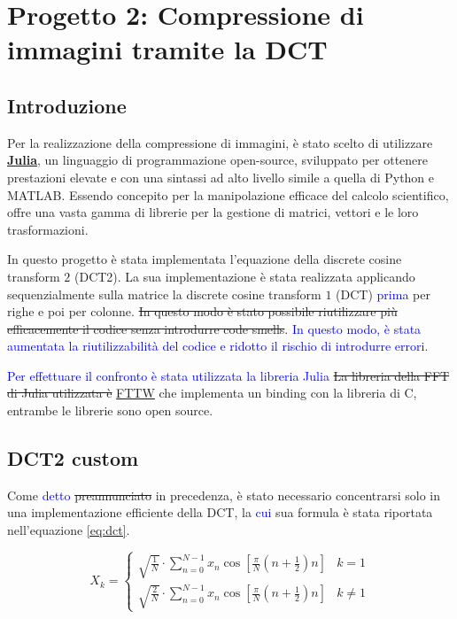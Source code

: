 \chapter{Progetto 2: Compressione di immagini tramite la DCT}

\section{Introduzione}
Per la realizzazione della compressione di immagini, è stato scelto di utilizzare
\href{https://julialang.org/}{\textbf{Julia}}, un linguaggio di programmazione open-source,
sviluppato per ottenere prestazioni elevate e con una sintassi ad alto livello simile
a quella di Python e MATLAB. Essendo concepito per la manipolazione efficace del
calcolo scientifico, offre una vasta gamma di librerie per la gestione di matrici,
vettori e le loro trasformazioni.

In questo progetto è stata implementata l'equazione della discrete cosine transform $2$ (DCT2).
La sua implementazione è stata realizzata applicando sequenzialmente sulla matrice
la discrete cosine transform $1$ (DCT) \textcolor{blue}{prima} per righe e poi
per colonne. \st{In questo modo è stato possibile riutilizzare più efficacemente il
    codice senza introdurre code smells}. %
\textcolor{blue}{In questo modo, è stata aumentata la riutilizzabilità del codice
    e ridotto il rischio di introdurre errori.}

\textcolor{blue}{Per effettuare il confronto è stata utilizzata la libreria Julia}
\st{La libreria della FFT di Julia utilizzata è} \href{https://github.com/JuliaMath/FFTW.jl}{FTTW}
che implementa un binding con la libreria di C, entrambe le librerie sono open source.

\section{DCT2 custom}
Come \textcolor{blue}{detto} \st{preannunciato} in precedenza, è stato necessario concentrarsi solo in una implementazione
efficiente della DCT, la \textcolor{blue}{cui} sua formula è stata riportata nell'equazione \ref{eq:dct}.

\begin{equation}
    X_k = \begin{cases}
        \sqrt{\frac{1}{N}}\cdot \sum_{n=0}^{N-1} x_n \cos\left[\frac{\pi}{N}\left(n + \frac{1}{2}\right) n \right] & k=1     \\
        \sqrt{\frac{2}{N}}\cdot\sum _{n=0}^{N-1}x_{n}\cos \left[\frac{\pi}{N}\left(n+\frac{1}{2}\right)n\right]    & k \ne 1
    \end{cases}
    \label{eq:dct}
\end{equation}

